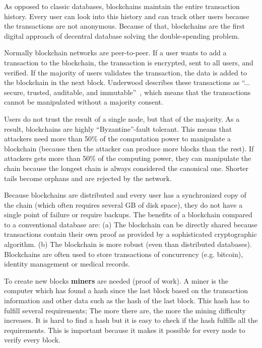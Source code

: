 As opposed to classic databases, blockchains maintain the entire transaction history.
Every user can look into this history and can track other users because the transactions are not anonymous.
Because of that, blockchains are the first digital approach of decentral database solving the double-spending problem.

Normally blockchain networks are peer-to-peer.
If a user wants to add a transaction to the blockchain, the transaction is encrypted, sent to all users, and verified.
If the majority of users validates the transaction, the data is added to the blockchain in the next block.
Underwood describes these transactions as ``... secure, trusted, auditable, and immutable''~\cite{Underwood}, which means that the transactions cannot be manipulated without a majority consent.

Users do not trust the result of a single node, but that of the majority.
As a result, blockchains are highly ``Byzantine''-fault tolerant.
This means that attackers need more than 50\% of the computation power to manipulate a blockchain (because then the attacker can produce more blocks than the rest).
If attackers gets more than 50\% of the computing power, they can manipulate the chain because the longest chain is always considered the canonical one.
Shorter tails become orphans and are rejected by the network.

Because blockchains are distributed and every user has a synchronized copy of the chain (which often requires several GB of disk space), they do not have a single point of failure or require backups.
The benefits of a blockchain compared to a conventional database are: (a) The blockchain can be directly shared because transactions contain their own proof as provided by a sophisticated cryptographic algorithm. (b) The blockchain is more robust (even than distributed databases).
Blockchains are often used to store transactions of concurrency (e.g. bitcoin), identity management or medical records.
\cite{Underwood,blockchain:eco}\newline\newline

To create new blocks \textbf{miners} are needed (proof of work).
A miner is the computer which has found a hash since the last block based on the transaction information and other data such as the hash of the last block.
This hash has to fulfill several requirements; The more there are, the more the mining difficulty increases.
It is hard to find a hash but it is easy to check if the hash fulfills all the requirements.
This is important because it makes it possible for every node to verify every block.

